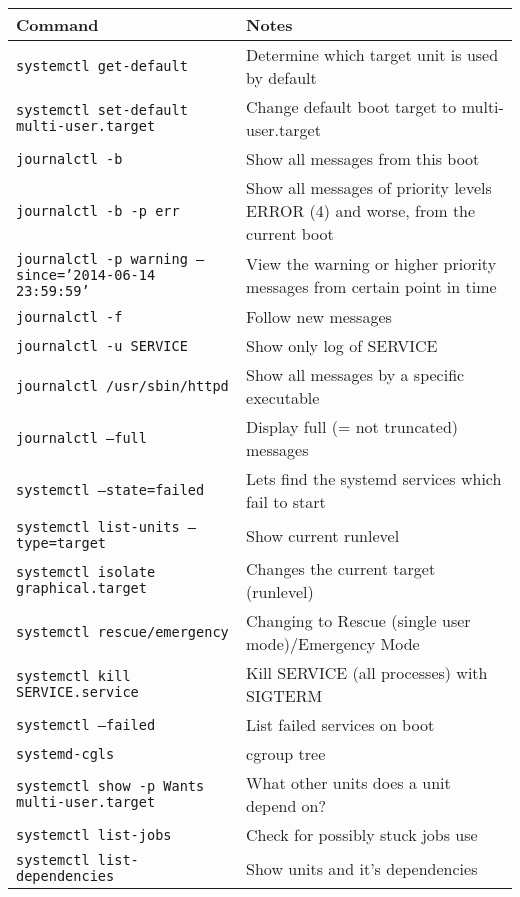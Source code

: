 \documentclass[a4paper]{article}
\begin{document}
\begin{center}
\vspace{6mm}

\begin{tabularx}{\textwidth}{ |l|X| }
\hline
\rowcolor[gray]{.8}
\bfseries Command                                       & \bfseries Notes \\\hline
\tt systemctl get-default                               & Determine which target unit is used by default \\\hline
\tt systemctl set-default multi-user.target             & Change default boot target to multi-user.target \\\hline
\tt journalctl -b                                       & Show all messages from this boot \\\hline
\tt journalctl -b -p err                                & Show all messages of priority levels ERROR (4) and worse, from the current boot \\\hline
\tt journalctl -p warning --since='2014-06-14 23:59:59' & View the warning or higher priority messages from certain point in time \\\hline
\tt journalctl -f                                       & Follow new messages \\\hline
\tt journalctl -u SERVICE                               & Show only log of SERVICE \\\hline
\tt journalctl /usr/sbin/httpd                          & Show all messages by a specific executable \\\hline
\tt journalctl --full                                   & Display full (= not truncated) messages \\\hline
\tt systemctl --state=failed                            & Lets find the systemd services which fail to start \\\hline
\tt systemctl list-units --type=target                  & Show current runlevel \\\hline
\tt systemctl isolate graphical.target                  & Changes the current target (runlevel) \\\hline
\tt systemctl rescue/emergency                          & Changing to Rescue (single user mode)/Emergency Mode \\\hline
\tt systemctl kill SERVICE.service                      & Kill SERVICE (all processes) with SIGTERM \\\hline
\tt systemctl --failed                                  & List failed services on boot \\\hline
\tt systemd-cgls                                        & cgroup tree \\\hline
\tt systemctl show -p Wants multi-user.target           & What other units does a unit depend on? \\\hline
\tt systemctl list-jobs                                 & Check for possibly stuck jobs use \\\hline
\tt systemctl list-dependencies                         & Show units and it's dependencies \\\hline
\end{tabularx}


\end{center}
\end{document}
